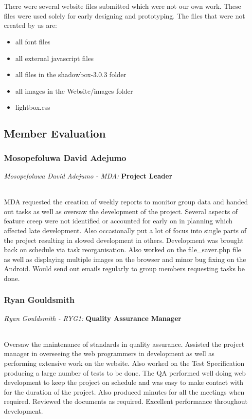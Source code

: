 \documentclass[12pt]{article}
\begin{document}
\\\\
There were several website files submitted which were not our own work. These files were used solely for early designing and prototyping.
The files that were not created by us are:
\begin{itemize}
\item all font files
\item all external javascript files
\item all files in the shadowbox-3.0.3 folder
\item all images in the Website/images folder
\item lightbox.css
\end{itemize}
\newpage
\subsection{Member Evaluation}
\subsubsection{Mosopefoluwa David Adejumo}
\centerline{\emph{Mosopefoluwa David Adejumo - MDA:} \textbf{Project Leader}}
~\\
MDA requested the creation of weekly reports to monitor group data and handed out tasks as well as oversaw the development of the project. Several aspects of feature creep were not identified or accounted for early on in planning which affected late development. Also occasionally put a lot of focus into single parts of the project resulting in slowed development in others. Development was brought back on schedule via task reorganisation. Also worked on the file\_saver.php file as well as displaying multiple images on the browser and minor bug fixing on the Android. Would send out emails regularly to group members requesting tasks be done. 
\subsubsection{Ryan Gouldsmith}
\centerline{\emph{Ryan Gouldsmith - RYG1:}\textbf{ Quality Assurance Manager}}
~\\
Oversaw the maintenance of standards in quality assurance. Assisted the project manager in overseeing the web programmers in development as well as performing extensive work on the website. Also worked on the Test Specification producing a large number of tests to be done. The QA performed well doing web development to keep the project on schedule and was easy to make contact with for the duration of the project. Also produced minutes for all the meetings when required. Reviewed the documents as required. Excellent performance throughout development.
\end{document}
